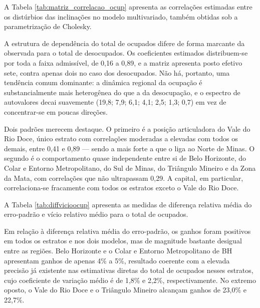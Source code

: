 \documentclass[rbe,wwwview]{econbr}
\begin{document}
\clearpage
\vspace{-0.3cm}

\vspace{-0.4cm}

A Tabela \ref{tab:matriz_correlacao_ocup} apresenta as correlações estimadas entre os distúrbios das inclinações no modelo multivariado, também obtidas sob a parametrização de Cholesky.

\vspace{-0.3cm}

\vspace{-0.4cm}

A estrutura de dependência do total de ocupados difere de forma marcante da observada para o total de desocupados. Os coeficientes estimados distribuem-se por toda a faixa admissível, de 0,16 a 0,89, e a matriz apresenta posto efetivo sete, contra apenas dois no caso dos desocupados. Não há, portanto, uma tendência comum dominante: a dinâmica regional da ocupação é substancialmente mais heterogênea do que a da desocupação, e o espectro de autovalores decai suavemente (19,8; 7,9; 6,1; 4,1; 2,5; 1,3; 0,7) em vez de concentrar-se em poucas direções.

Dois padrões merecem destaque. O primeiro é a posição articuladora do Vale do Rio Doce, único estrato com correlações moderadas a elevadas com todos os demais, entre 0,41 e 0,89 --- sendo a mais forte a que o liga ao Norte de Minas. O segundo é o comportamento quase independente entre si de Belo Horizonte, do Colar e Entorno Metropolitano, do Sul de Minas, do Triângulo Mineiro e da Zona da Mata, com correlações que não ultrapassam 0,29. A capital, em particular, correlaciona-se fracamente com todos os estratos exceto o Vale do Rio Doce.

A Tabela \ref{tab:diffvicioocup} apresenta as medidas de diferença relativa média do erro-padrão e vício relativo médio para o total de ocupados.

\vspace{-3cm}

\vspace{-2cm}

Em relação à diferença relativa média do erro-padrão, os ganhos foram positivos em todos os estratos e nos dois modelos, mas de magnitude bastante desigual entre as regiões. Belo Horizonte e o Colar e Entorno Metropolitano de BH apresentam ganhos de apenas 4\% a 5\%, resultado coerente com a elevada precisão já existente nas estimativas diretas do total de ocupados nesses estratos, cujo coeficiente de variação médio é de 1,8\% e 2,2\%, respectivamente. No extremo oposto, o Vale do Rio Doce e o Triângulo Mineiro alcançam ganhos de 23,0\% e 22,7\%.
\end{document}
